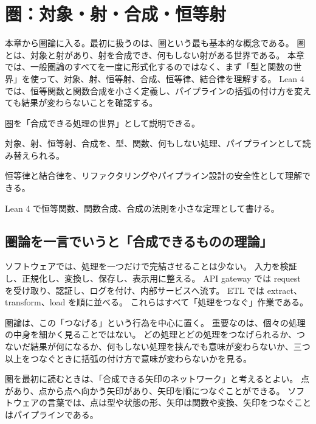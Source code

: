 \chapter{圏：対象・射・合成・恒等射}
\label{chap:ch05_category}

\begin{chapterabstract}
本章から圏論に入る。最初に扱うのは、圏という最も基本的な概念である。
圏とは、対象と射があり、射を合成でき、何もしない射がある世界である。
本章では、一般圏論のすべてを一度に形式化するのではなく、まず「型と関数の世界」を使って、対象、射、恒等射、合成、恒等律、結合律を理解する。
Lean 4 では、恒等関数と関数合成を小さく定義し、パイプラインの括弧の付け方を変えても結果が変わらないことを確認する。
\end{chapterabstract}

\begin{learninggoals}
\item 圏を「合成できる処理の世界」として説明できる。
\item 対象、射、恒等射、合成を、型、関数、何もしない処理、パイプラインとして読み替えられる。
\item 恒等律と結合律を、リファクタリングやパイプライン設計の安全性として理解できる。
\item Lean 4 で恒等関数、関数合成、合成の法則を小さな定理として書ける。
\end{learninggoals}

\section{圏論を一言でいうと「合成できるものの理論」}

ソフトウェアでは、処理を一つだけで完結させることは少ない。
入力を検証し、正規化し、変換し、保存し、表示用に整える。
API gateway では request を受け取り、認証し、ログを付け、内部サービスへ流す。
ETL では extract、transform、load を順に並べる。
これらはすべて「処理をつなぐ」作業である。

圏論は、この「つなげる」という行為を中心に置く。
重要なのは、個々の処理の中身を細かく見ることではない。
どの処理とどの処理をつなげられるか、つないだ結果が何になるか、何もしない処理を挟んでも意味が変わらないか、三つ以上をつなぐときに括弧の付け方で意味が変わらないかを見る。

\begin{intuitionbox}
圏を最初に読むときは、「合成できる矢印のネットワーク」と考えるとよい。
点があり、点から点へ向かう矢印があり、矢印を順につなぐことができる。
ソフトウェアの言葉では、点は型や状態の形、矢印は関数や変換、矢印をつなぐことはパイプラインである。
\end{intuitionbox}

